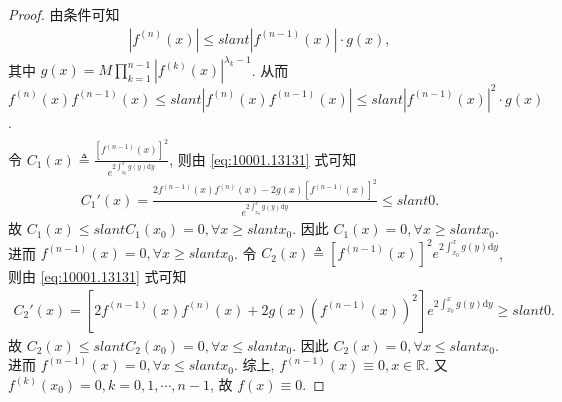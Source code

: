 \documentclass[../../main.tex]{subfiles}
\begin{document}
\begin{proof}
由条件可知
\begin{align*}
|f^{(n)}(x)| \leqslant slant |f^{(n-1)}(x)| \cdot g(x),
\end{align*}
其中 $g(x) = M \prod_{k=1}^{n-1} |f^{(k)}(x)|^{\lambda_k - 1}$. 从而 $f^{(n)}(x) f^{(n-1)}(x) \leqslant slant |f^{(n)}(x) f^{(n-1)}(x)| \leqslant slant |f^{(n-1)}(x)|^2 \cdot g(x)$.
\begin{align}
\label{eq:10001.13131}
\end{align}
令 $C_1(x) \triangleq \frac{[f^{(n-1)}(x)]^2}{e^{2\int_{x_0}^x g(y) \mathrm{d}y}}$, 则由 \eqref{eq:10001.13131} 式可知
\begin{align*}
C_1'(x) = \frac{2f^{(n-1)}(x) f^{(n)}(x) - 2g(x) [f^{(n-1)}(x)]^2}{e^{2\int_{x_0}^x g(y) \mathrm{d}y}} \leqslant slant 0.
\end{align*}
故 $C_1(x) \leqslant slant C_1(x_0) = 0, \forall x \geqslant slant x_0$. 因此 $C_1(x) = 0, \forall x \geqslant slant x_0$. 进而 $f^{(n-1)}(x) = 0, \forall x \geqslant slant x_0$.
令 $C_2(x) \triangleq [f^{(n-1)}(x)]^2 e^{2\int_{x_0}^x g(y) \mathrm{d}y}$, 则由 \eqref{eq:10001.13131} 式可知
\begin{align*}
C_2'(x) = \left[ 2f^{(n-1)}(x) f^{(n)}(x) + 2g(x) (f^{(n-1)}(x))^2 \right] e^{2\int_{x_0}^x g(y) \mathrm{d}y} \geqslant slant 0.
\end{align*}
故 $C_2(x) \leqslant slant C_2(x_0) = 0, \forall x \leqslant slant x_0$. 因此 $C_2(x) = 0, \forall x \leqslant slant x_0$. 进而 $f^{(n-1)}(x) = 0, \forall x \leqslant slant x_0$.
综上, $f^{(n-1)}(x) \equiv 0, x \in \mathbb{R}$. 又 $f^{(k)}(x_0) = 0, k = 0, 1, \cdots, n-1$, 故 $f(x) \equiv 0$.
\end{proof}
\end{document}
